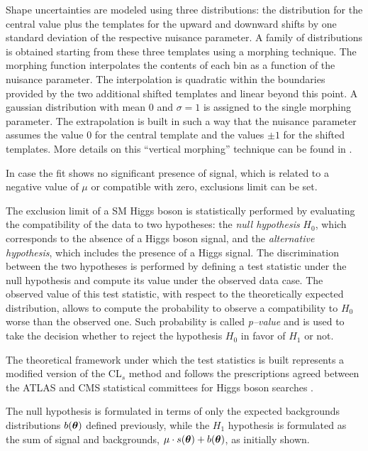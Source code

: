 Shape uncertainties are modeled using three distributions: the distribution for the central value plus the templates for the upward and downward shifts by one standard deviation of the respective nuisance parameter. A family of distributions is obtained starting from these three templates using a morphing technique. The morphing function interpolates the contents of each bin as a function of the nuisance parameter. The interpolation is quadratic within the boundaries provided by the two additional shifted templates and linear beyond this point. A gaussian distribution with mean 0 and $\sigma = 1$ is assigned to the single morphing parameter. The extrapolation is built in such a way that the nuisance parameter assumes the value 0 for the central template and the values $\pm1$ for the shifted templates. More details on this ``vertical morphing'' technique can be found in \cite{Conway:2011in}.

{\color{red}
In case the fit shows no significant presence of signal, which is related to a negative value of $\mu$ or compatible with zero, exclusions limit can be set.
}


The exclusion limit of a SM Higgs boson is statistically performed by evaluating the compatibility of the data to two hypotheses: the \emph{null hypothesis} $H_0$, which corresponds to the absence of a Higgs boson signal, and the  \emph{alternative hypothesis}, which includes the presence of a Higgs signal. The discrimination between the two hypotheses is performed by defining a test statistic under the null hypothesis and compute its value under the observed data case. The observed value of this test statistic, with respect to the theoretically expected distribution, allows to compute the probability to observe a compatibility to $H_0$ worse than the observed one. Such probability is called \emph{p--value} and is used to take the decision whether to reject the hypothesis $H_0$ in favor of $H_1$ or not.

The theoretical framework under which the test statistics is built represents a modified version of the CL$_s$ method \cite{CLs} and follows the prescriptions agreed between the ATLAS and CMS statistical committees for Higgs boson searches \cite{higgscombo}.

{\color{red}
The null hypothesis is formulated in terms of only the expected backgrounds distributions $b(\boldsymbol\theta)$ defined previously, while 
the $H_1$ hypothesis is formulated as the sum of signal and backgrounds, $\mu \cdot s(\boldsymbol\theta) + b(\boldsymbol\theta)$, as initially shown.
}

